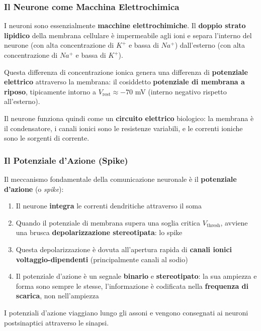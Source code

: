 \subsubsection{Il Neurone come Macchina Elettrochimica}

I neuroni sono essenzialmente \textbf{macchine elettrochimiche}. Il \textbf{doppio strato lipidico} della membrana cellulare è impermeabile agli ioni e separa l'interno del neurone (con alta concentrazione di $K^+$ e bassa di $Na^+$) dall'esterno (con alta concentrazione di $Na^+$ e bassa di $K^+$).

Questa differenza di concentrazione ionica genera una differenza di \textbf{potenziale elettrico} attraverso la membrana: il cosiddetto \textbf{potenziale di membrana a riposo}, tipicamente intorno a $V_{\text{rest}} \approx -70$ mV (interno negativo rispetto all'esterno).

Il neurone funziona quindi come un \textbf{circuito elettrico} biologico: la membrana è il condensatore, i canali ionici sono le resistenze variabili, e le correnti ioniche sono le sorgenti di corrente.

\subsubsection{Il Potenziale d'Azione (Spike)}

Il meccanismo fondamentale della comunicazione neuronale è il \textbf{potenziale d'azione} (o \textit{spike}):

\begin{enumerate}
    \item Il neurone \textbf{integra} le correnti dendritiche attraverso il soma
    \item Quando il potenziale di membrana supera una soglia critica $V_{\text{thresh}}$, avviene una brusca \textbf{depolarizzazione stereotipata}: lo spike
    \item Questa depolarizzazione è dovuta all'apertura rapida di \textbf{canali ionici voltaggio-dipendenti} (principalmente canali al sodio)
    \item Il potenziale d'azione è un segnale \textbf{binario} e \textbf{stereotipato}: la sua ampiezza e forma sono sempre le stesse, l'informazione è codificata nella \textbf{frequenza di scarica}, non nell'ampiezza
\end{enumerate}

I potenziali d'azione viaggiano lungo gli assoni e vengono consegnati ai neuroni postsinaptici attraverso le sinapsi.

